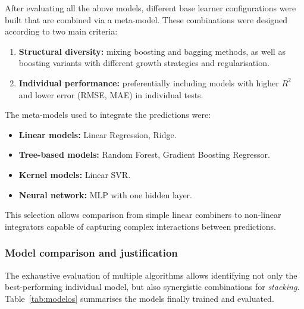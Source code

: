 After evaluating all the above models, different base learner configurations were built that are combined via a meta-model. These combinations were designed according to two main criteria:

\begin{enumerate}
    \item \textbf{Structural diversity:} mixing boosting and bagging methods, as well as boosting variants with different growth strategies and regularisation.
    \item \textbf{Individual performance:} preferentially including models with higher $R^2$ and lower error (RMSE, MAE) in individual tests.
\end{enumerate}

The meta-models used to integrate the predictions were:

\begin{itemize}
    \item \textbf{Linear models:} Linear Regression, Ridge.
    \item \textbf{Tree-based models:} Random Forest, Gradient Boosting Regressor.
    \item \textbf{Kernel models:} Linear SVR.
    \item \textbf{Neural network:} MLP with one hidden layer.
\end{itemize}

This selection allows comparison from simple linear combiners to non-linear integrators capable of capturing complex interactions between predictions.

\subsubsection{Model comparison and justification}

The exhaustive evaluation of multiple algorithms allows identifying not only the best-performing individual model, but also synergistic combinations for \textit{stacking}. Table~\ref{tab:modelos} summarises the models finally trained and evaluated.


